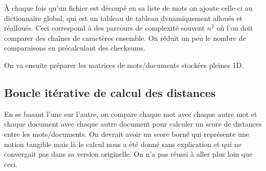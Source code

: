 À chaque fois qu'un fichier est découpé en sa liste de mots
on ajoute celle-ci au dictionnaire global, qui est un tableau
de tableau dynamiquement alloués et réalloués.
Ceci correspond à des parcours de complexité souvent $n^2$
où l'on doit comparer des chaînes de caractères ensemble.
On réduit un peu le nombre de comparaisons en précalculant
des checksums.

On va ensuite préparer les matrices de mots/documents stockées
pleines 1D.

\subsection{Boucle itérative de calcul des distances}

En se basant l'une sur l'autre, on compare chaque mot avec
chaque autre mot et chaque document avec chaque autre
document pour calculer un score de distances entre les
mots/documents. On devrait avoir un score borné qui
représente une notion tangible mais là le calcul nous
a été donné sans explication et qui ne convergait pas
dans sa version originelle. On n'a pas réussi à aller plus
loin que ceci.
